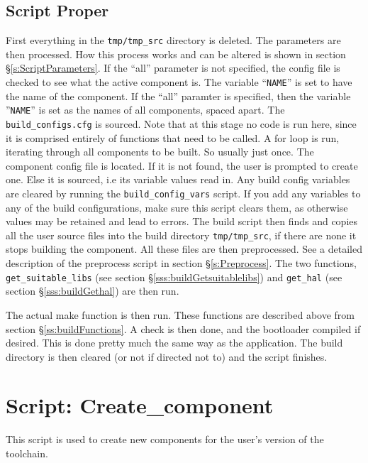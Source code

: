 \documentclass[a4paper, oneside, 11pt, titlepage, onecolumn, openright]{report}
\begin{document}
			
			
\subsection{Script Proper}
			\label{sss:buildScriptProper}
			First everything in the \texttt{tmp/tmp\_src} directory is deleted. The parameters are then processed. How this process works and can be altered is shown in section \S\ref{s:ScriptParameters}.\newline
			If the ``all'' parameter is not specified, the config file is checked to see what the active component is. The variable ``\texttt{NAME}'' is set to have the name of the component.\newline
			If the ``all'' paramter is specified, then the variable ''\texttt{NAME}'' is set as the names of all components, spaced apart.\newline
			The \texttt{build\_configs.cfg} is sourced. Note that at this stage no code is run here, since it is comprised entirely of functions that need to be called.\newline
			A for loop is run, iterating through all components to be built. So usually just once.\newline
			The component config file is located. If it is not found, the user is prompted to create one. Else it is sourced, i.e its variable values read in. Any build config variables are cleared by running the \texttt{build\_config\_vars} script. If you add any variables to any of the build configurations, make sure this script clears them, as otherwise values may be retained and lead to errors.\newline
			The build script then finds and copies all the user source files into the build directory \texttt{tmp/tmp\_src}, if there are none it stops building the component. All these files are then preprocessed. See a detailed description of the preprocess script in section \S\ref{s:Preprocess}.
			The two functions, \texttt{get\_suitable\_libs} (see section \S\ref{sss:buildGetsuitablelibs}) and \texttt{get\_hal} (see section \S\ref{sss:buildGethal}) are then run.
			
			The actual make function is then run. These functions are described above from section \S\ref{ss:buildFunctions}.			
			A check is then done, and the bootloader compiled if desired. This is done pretty much the same way as the application.
			The build directory is then cleared (or not if directed not to) and the script finishes.
			

\section{Script: Create\_component}
			\label{s:createComponent}
			This script is used to create new components for the user's version of the toolchain.
			
\end{document}
